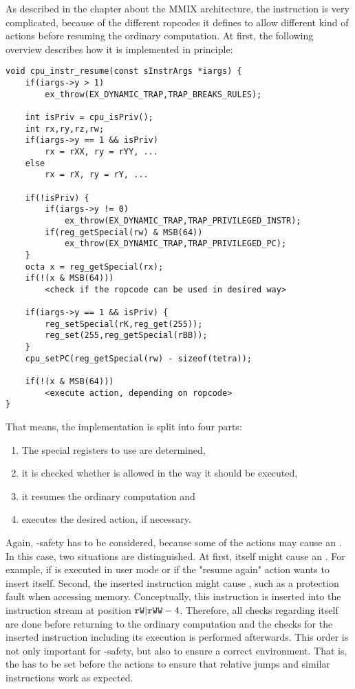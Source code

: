 As described in the chapter about the MMIX architecture, the  instruction is very complicated, because of the different ropcodes it defines to allow different kind of actions before resuming the ordinary computation. At first, the following overview describes how it is implemented in principle:
\begin{lstlisting}[language=GIMMIXC,caption={The implementation of \mi{RESUME} (partially pseudo-code)}]
void cpu_instr_resume(const sInstrArgs *iargs) {
	if(iargs->y > 1)
		ex_throw(EX_DYNAMIC_TRAP,TRAP_BREAKS_RULES);

	int isPriv = cpu_isPriv();
	int rx,ry,rz,rw;
	if(iargs->y == 1 && isPriv)
		rx = rXX, ry = rYY, ...
	else
		rx = rX, ry = rY, ...

	if(!isPriv) {
		if(iargs->y != 0)
			ex_throw(EX_DYNAMIC_TRAP,TRAP_PRIVILEGED_INSTR);
		if(reg_getSpecial(rw) & MSB(64))
			ex_throw(EX_DYNAMIC_TRAP,TRAP_PRIVILEGED_PC);
	}
	octa x = reg_getSpecial(rx);
	if(!(x & MSB(64)))
		<check if the ropcode can be used in desired way>

	if(iargs->y == 1 && isPriv) {
		reg_setSpecial(rK,reg_get(255));
		reg_set(255,reg_getSpecial(rBB));
	}
	cpu_setPC(reg_getSpecial(rw) - sizeof(tetra));

	if(!(x & MSB(64)))
		<execute action, depending on ropcode>
}
\end{lstlisting}
That means, the implementation is split into four parts:
\begin{enumerate}
	\item The special registers to use are determined,
	\item it is checked whether  is allowed in the way it should be executed,
	\item it resumes the ordinary computation and
	\item executes the desired action, if necessary.
\end{enumerate}
Again, -safety has to be considered, because some of the actions may cause an . In this case, two situations are distinguished. At first,  itself might cause an . For example, if  is executed in user mode or if the "resume again" action wants to insert  itself. Second, the inserted instruction might cause , such as a protection fault when accessing memory. Conceptually, this instruction is inserted into the instruction stream at position ${\tt rW}|{\tt rWW}-4$. Therefore, all checks regarding  itself are done before returning to the ordinary computation and the checks for the inserted instruction including its execution is performed afterwards. This order is not only important for -safety, but also to ensure a correct environment. That is, \eg the  has to be set before the actions to ensure that relative jumps and similar instructions work as expected.

